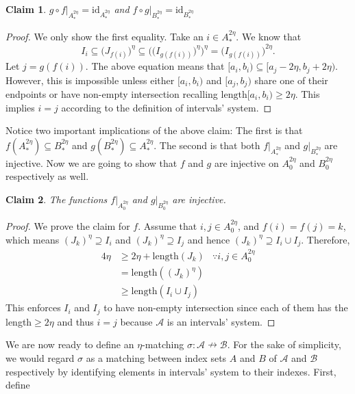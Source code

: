 \documentclass[a4paper,12pt]{article}
\newtheorem{claim}{Claim}[section]
\newcommand{\length}[1]{\mathrm{length}(#1)}
\begin{document}
\begin{claim}\label{one-to-one} $g\circ f|_{A^{2\eta}_{*}}=\mathrm{id}_{A^{2\eta}_{*}}$  and $f\circ g|_{B^{2\eta}_{*}}=\mathrm{id}_{B^{2\eta}_{*}}$ 

\end{claim}
\begin{proof}
We only show the first equality. Take an $i \in A^{2\eta}_\ast$. We know that 
\begin{equation*}
I_i \subseteq \big(J_{f(i)}\big)^\eta\subseteq \bigg(\big(I_{g(f(i))}\big)^\eta\bigg)^\eta = \big(I_{g(f(i))}\big)^{2\eta}.
\end{equation*}
Let $j=g(f(i))$. The above equation means that $[a_i,b_i)\subseteq [a_j-2\eta,b_j+2\eta)$. However, this is impossible unless either $[a_i,b_i)$ and $[a_j,b_j)$ share one of their endpoints or have non-empty intersection recalling $\mathrm{length}[a_i,b_i)\geq 2\eta$. This implies $i=j$ according to the definition of intervals' system. 
\end{proof}

Notice two important implications of the above claim: The first is that $f(A_*^{2\eta})\subseteq B_*^{2\eta}$ and $g(B_*^{2\eta})\subseteq A_*^{2\eta}$. The second is that both $f|_{A^{2\eta}_{*}}$ and $g|_{B^{2\eta}_{*}}$ are injective. Now we are going to show that $f$ and $g$ are injective on $A^{2\eta}_{0}$ and $B^{2\eta}_{0}$ respectively as well.

\begin{claim}\label{injective}
The functions $f|_{A^{2\eta}_0}$ and $g|_{B^{2\eta}_0}$ are injective.
\end{claim}
\begin{proof}
We prove the claim for $f$. Assume that $i,j \in A^{2\eta}_0$, and $f(i) = f(j)=k$, which means $(J_{k})^\eta\supseteq I_i$ and $(J_{k})^\eta\supseteq I_{j}$ and hence $(J_{k})^\eta\supseteq I_i \cup I_{j}.$ Therefore,
\begin{align*}
4\eta&\geq 2\eta+\length{J_{k}}&\because i,j \in A_0^{2\eta}
\\&=\length{(J_{k})^\eta}
\\&\geq \length{I_{i}\cup I_{j}}
\end{align*}
This enforces $I_i$ and $I_j$ to have non-empty intersection since each of them has the length$\geq 2\eta$ and thus $i=j$ because $\mathcal{A}$ is an intervals' system. \end{proof}
We are now ready to define an $\eta$-matching $\sigma:\mathcal{A}\nrightarrow \mathcal{B}$. For the sake of simplicity, we would regard $\sigma$ as a matching between index sets $A$ and $B$ of $\mathcal{A}$ and $\mathcal{B}$ respectively by identifying elements in intervals' system to their indexes. 
First, define 
\end{document}
